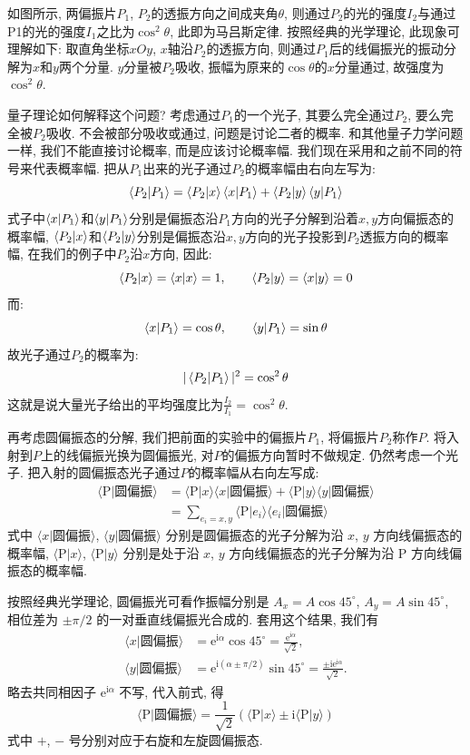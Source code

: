如图所示, 两偏振片$P_1$, $P_2$的透振方向之间成夹角$\theta$, 则通过$P_2$的光的强度$I_2$与通过P1的光的强度$I_1$之比为$\cos^2\theta$, 此即为马吕斯定律. 按照经典的光学理论, 此现象可理解如下: 取直角坐标$xOy$, $x$轴沿$P_2$的透振方向, 则通过$P_1$后的线偏振光的振动分解为$x$和$y$两个分量. $y$分量被$P_2$吸收, 振幅为原来的$\cos\theta$的$x$分量通过, 故强度为$\cos^2\theta$.

量子理论如何解释这个问题? 考虑通过$P_1$的一个光子, 其要么完全通过$P_2$, 要么完全被$P_2$吸收. 不会被部分吸收或通过, 问题是讨论二者的概率. 和其他量子力学问题一样, 我们不能直接讨论概率, 而是应该讨论概率幅. 我们现在采用和之前不同的符号来代表概率幅. 把从$P_1$出来的光子通过$P_2$的概率幅由右向左写为:
\[
\bra{P_2}\ket{P_1} = \bra{P_2}\ket{x}\bra{x}\ket{P_1}+\bra{P_2}\ket{y}\bra{y}\ket{P_1}
\]
式子中$\bra{x}\ket{P_1}$和$\bra{y}\ket{P_1}$分别是偏振态沿$P_1$方向的光子分解到沿着$x, y$方向偏振态的概率幅, $\bra{P_2}\ket{x}$和$\bra{P_2}\ket{y}$分别是偏振态沿$x, y$方向的光子投影到$P_2$透振方向的概率幅, 在我们的例子中$P_2$沿$x$方向, 因此:
\[
\bra{P_2}\ket{x} = \bra{x}\ket{x} = 1, \qquad \bra{P_2}\ket{y} = \bra{x}\ket{y} = 0
\]
而:
\[
\bra{x}\ket{P_1} =\cos\theta, \qquad  \bra{y}\ket{P_1} = \sin\theta
\]
故光子通过$P_2$的概率为:
\[
|\bra{P_2}\ket{P_1}|^2 = \cos^2\theta
\]
这就是说大量光子给出的平均强度比为$\frac{I_2}{I_1}=\cos^2\theta$.

再考虑圆偏振态的分解, 我们把前面的实验中的偏振片$P_1$, 将偏振片$P_2$称作$P$. 将入射到$P$上的线偏振光换为圆偏振光, 对$P$的偏振方向暂时不做规定. 仍然考虑一个光子. 把入射的圆偏振态光子通过$P$的概率幅从右向左写成:
\begin{align*}
\langle \text{P}|\text{圆偏振}\rangle &= \langle \text{P}|x\rangle\langle x|\text{圆偏振}\rangle + \langle \text{P}|y\rangle\langle y|\text{圆偏振}\rangle \\
&= \sum_{e_i=x, y} \langle \text{P}|e_i\rangle\langle e_i|\text{圆偏振}\rangle
\end{align*}
式中 $\langle x|\text{圆偏振}\rangle$, $\langle y|\text{圆偏振}\rangle$ 分别是圆偏振态的光子分解为沿 $x$, $y$ 方向线偏振态的概率幅, $\langle \text{P}|x\rangle$, $\langle \text{P}|y\rangle$ 分别是处于沿 $x$, $y$ 方向线偏振态的光子分解为沿 $\text{P}$ 方向线偏振态的概率幅.

按照经典光学理论, 圆偏振光可看作振幅分别是 $A_x = A\cos 45^\circ$, $A_y = A\sin 45^\circ$, 相位差为 $\pm \pi/2$ 的一对垂直线偏振光合成的. 套用这个结果, 我们有
\begin{align*}
\langle x|\text{圆偏振}\rangle &= \mathrm{e}^{\mathrm{i}\alpha}\cos 45^\circ = \frac{\mathrm{e}^{\mathrm{i}\alpha}}{\sqrt{2}}, \\
\langle y|\text{圆偏振}\rangle &= \mathrm{e}^{\mathrm{i}(\alpha \pm \pi/2)}\sin 45^\circ = \frac{\pm \mathrm{i}\mathrm{e}^{\mathrm{i}\alpha}}{\sqrt{2}}.
\end{align*}
略去共同相因子 $\mathrm{e}^{\mathrm{i}\alpha}$ 不写, 代入前式, 得
\[
\langle \text{P}|\text{圆偏振}\rangle = \frac{1}{\sqrt{2}} (\langle \text{P}|x\rangle \pm \mathrm{i}\langle \text{P}|y\rangle)
\]
式中 $+$, $-$ 号分别对应于右旋和左旋圆偏振态.

